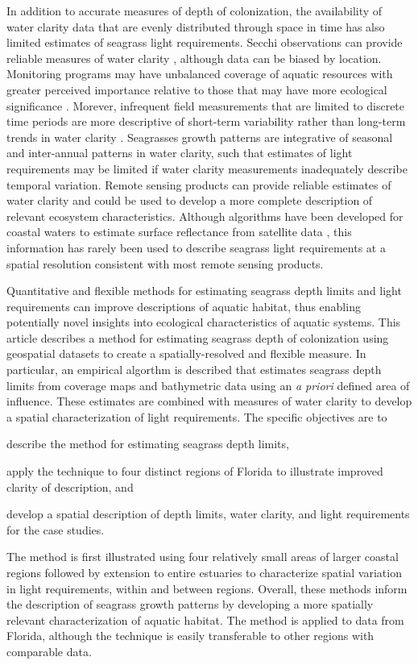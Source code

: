 \documentclass[letterpaper,12pt,oneside]{article}\usepackage[]{graphicx}\usepackage[]{color}
\begin{document}
In addition to accurate measures of depth of colonization, the availability of water clarity data that are evenly distributed through space in time has also limited estimates of seagrass light requirements.  Secchi observations can provide reliable measures of water clarity , although data can be biased by location.  Monitoring programs may have unbalanced coverage of aquatic resources with greater perceived importance relative to those that may have more ecological significance \citep{Wagner08,Lottig14}.  Morever, infrequent field measurements that are limited to discrete time periods are more descriptive of short-term variability rather than long-term trends in water clarity \citep{Elsdon09}.  Seagrasses growth patterns are integrative of seasonal and inter-annual patterns in water clarity, such that estimates of light requirements may be limited if water clarity measurements inadequately describe temporal variation.  Remote sensing products can provide reliable estimates of water clarity and could be used to develop a more complete description of relevant ecosystem characteristics.  Although algorithms have been developed for coastal waters to estimate surface reflectance from satellite data \citep{Woodruff99,Chen07}, this information has rarely been used to describe seagrass light requirements at a spatial resolution consistent with most remote sensing products.    

Quantitative and flexible methods for estimating seagrass depth limits and light requirements can improve descriptions of aquatic habitat, thus enabling potentially novel insights into ecological characteristics of aquatic systems.  This article describes a method for estimating seagrass depth of colonization using geospatial datasets to create a spatially-resolved and flexible measure.  In particular, an empirical algorthm is described that estimates seagrass depth limits from coverage maps and bathymetric data using an \textit{a priori} defined area of influence. These estimates are combined with measures of water clarity to develop a spatial characterization of light requirements.  The specific objectives are to\begin{inparaenum}[1\upshape)]
\item describe the method for estimating seagrass depth limits, 
\item apply the technique to four distinct regions of Florida to illustrate improved clarity of description, and
\item develop a spatial description of depth limits, water clarity, and light requirements for the case studies.  
\end{inparaenum}
The method is first illustrated using four relatively small areas of larger coastal regions followed by extension to entire estuaries to characterize spatial variation in light requirements, within and between regions.  Overall, these methods inform the description of seagrass growth patterns by developing a more spatially relevant characterization of aquatic habitat.  The method is applied to data from Florida, although the technique is easily transferable to other regions with comparable data. 
\end{document}
